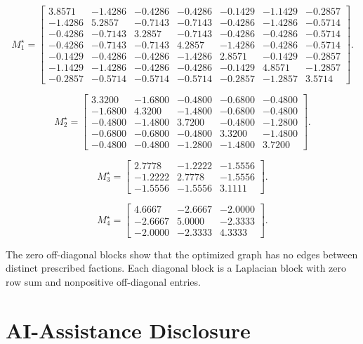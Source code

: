 \documentclass[11pt]{article}
\begin{document}
\[
M^\star_1=
\begin{bmatrix}
 3.8571 & -1.4286 & -0.4286 & -0.4286 & -0.1429 & -1.1429 & -0.2857\\
-1.4286 &  5.2857 & -0.7143 & -0.7143 & -0.4286 & -1.4286 & -0.5714\\
-0.4286 & -0.7143 &  3.2857 & -0.7143 & -0.4286 & -0.4286 & -0.5714\\
-0.4286 & -0.7143 & -0.7143 &  4.2857 & -1.4286 & -0.4286 & -0.5714\\
-0.1429 & -0.4286 & -0.4286 & -1.4286 &  2.8571 & -0.1429 & -0.2857\\
-1.1429 & -1.4286 & -0.4286 & -0.4286 & -0.1429 &  4.8571 & -1.2857\\
-0.2857 & -0.5714 & -0.5714 & -0.5714 & -0.2857 & -1.2857 &  3.5714
\end{bmatrix}.
\]

\[
M^\star_2=
\begin{bmatrix}
 3.3200 & -1.6800 & -0.4800 & -0.6800 & -0.4800\\
-1.6800 &  4.3200 & -1.4800 & -0.6800 & -0.4800\\
-0.4800 & -1.4800 &  3.7200 & -0.4800 & -1.2800\\
-0.6800 & -0.6800 & -0.4800 &  3.3200 & -1.4800\\
-0.4800 & -0.4800 & -1.2800 & -1.4800 &  3.7200
\end{bmatrix}.
\]

\[
M^\star_3=
\begin{bmatrix}
 2.7778 & -1.2222 & -1.5556\\
-1.2222 &  2.7778 & -1.5556\\
-1.5556 & -1.5556 &  3.1111
\end{bmatrix}.
\]

\[
M^\star_4=
\begin{bmatrix}
 4.6667 & -2.6667 & -2.0000\\
-2.6667 &  5.0000 & -2.3333\\
-2.0000 & -2.3333 &  4.3333
\end{bmatrix}.
\]

The zero off-diagonal blocks show that the optimized graph has no edges between
distinct prescribed factions. Each diagonal block is a Laplacian block with
zero row sum and nonpositive off-diagonal entries.

    
	\section*{AI-Assistance Disclosure}
	
\end{document}
